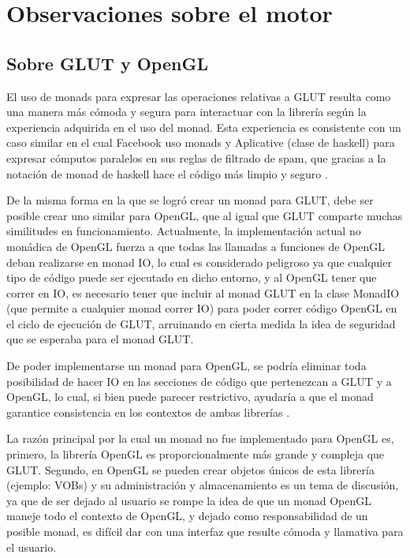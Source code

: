 \section{Observaciones sobre el motor}

\subsection{Sobre GLUT y OpenGL}

El uso de monads para expresar las operaciones relativas a GLUT resulta como una manera más cómoda y segura para interactuar con la librería según la experiencia adquirida en el uso del monad. Esta experiencia es consistente con un caso similar en el cual Facebook uso monads y Aplicative (clase de haskell) para expresar cómputos paralelos en sus reglas de filtrado de spam, que gracias a la notación de monad de haskell hace el código más limpio y seguro \cite{marlow2014there} \cite{Facebook:Fighting} \cite{Facebook:sourcing}.

De la misma forma en la que se logró crear un monad para GLUT,  debe ser posible crear uno similar para OpenGL, que al igual que GLUT comparte muchas similitudes en funcionamiento. Actualmente, la implementación actual no monádica de OpenGL fuerza a que todas las llamadas a funciones de OpenGL deban realizarse en monad IO, lo cual es considerado peligroso ya que cualquier tipo de código puede ser ejecutado en dicho entorno, y al OpenGL tener que correr en IO, es necesario tener que incluir al monad GLUT en la clase MonadIO (que permite a cualquier monad correr IO) para poder correr código OpenGL en el ciclo de ejecución de GLUT, arruinando en cierta medida la idea de seguridad que se esperaba para el monad GLUT.

De poder implementarse un monad para OpenGL, se podría eliminar toda posibilidad de hacer IO en las secciones de código que pertenezcan a GLUT y a OpenGL, lo cual, si bien puede parecer restrictivo, ayudaría a que el monad garantice consistencia en los contextos de ambas librerías \cite{hughes2000generalising}.

La razón principal por la cual un monad no fue implementado para OpenGL es, primero, la librería OpenGL es proporcionalmente más grande y compleja que GLUT. Segundo, en OpenGL se pueden crear objetos únicos de esta librería (ejemplo: VOBs) y su administración y almacenamiento es un tema de discusión, ya que de ser dejado al usuario se rompe la idea de que un monad OpenGL maneje todo el contexto de OpenGL, y dejado como responsabilidad de un posible monad, es difícil dar con una interfaz que resulte cómoda y llamativa para el usuario.

